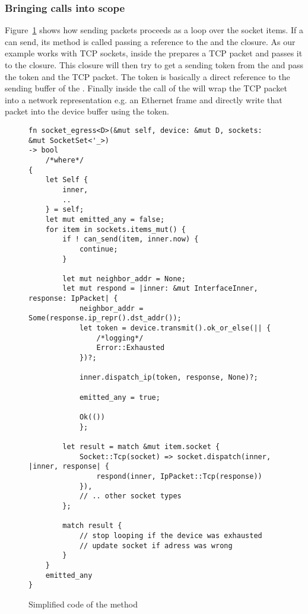 \subsubsection{Bringing \dev{} calls into scope}
\label{subsec:DeviceLifting}
Figure~\ref{fig:egressCode} shows how sending packets proceeds as a loop over the socket items. If a  can send, its  method is called passing a reference to the \stack{} and the  closure. As our example works with TCP sockets, inside  the  prepares a TCP packet and passes it to the  closure. This closure will then try to get a sending token from the \dev{} and pass the token and the TCP packet. The token is basically a direct reference to the sending buffer of the \dev{}. Finally inside the  call of the  will wrap the TCP packet into a network representation e.g. an Ethernet frame and directly write that packet into the device buffer using the token.\\
 
\begin{figure}[H]
    \centering
    
\begin{verbatim}
fn socket_egress<D>(&mut self, device: &mut D, sockets: &mut SocketSet<'_>) 
-> bool
    /*where*/
{
    let Self {
        inner,
        ..
    } = self;
    let mut emitted_any = false;
    for item in sockets.items_mut() {
        if ! can_send(item, inner.now) {
            continue;
        }

        let mut neighbor_addr = None;
        let mut respond = |inner: &mut InterfaceInner, response: IpPacket| {
            neighbor_addr = Some(response.ip_repr().dst_addr());
            let token = device.transmit().ok_or_else(|| {
                /*logging*/
                Error::Exhausted
            })?;

            inner.dispatch_ip(token, response, None)?;
            
            emitted_any = true;

            Ok(())
            };

        let result = match &mut item.socket {
            Socket::Tcp(socket) => socket.dispatch(inner, |inner, response| {
                respond(inner, IpPacket::Tcp(response))
            }),
            // .. other socket types
        };
        
        match result {
            // stop looping if the device was exhausted
            // update socket if adress was wrong
        }
    }
    emitted_any
}
\end{verbatim}
    \caption{Simplified code of the  method}
    \label{fig:egressCode}
\end{figure}

